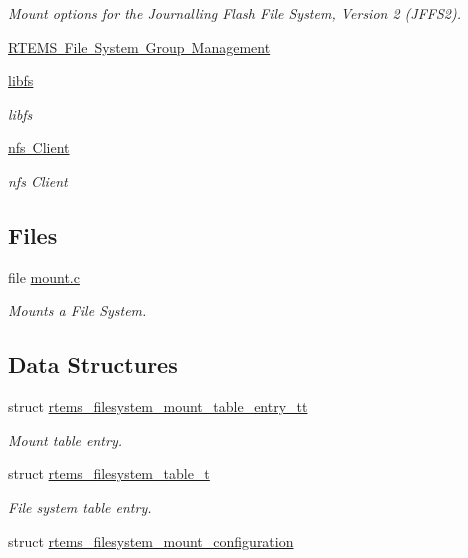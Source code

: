 \begin{DoxyCompactItemize}
\begin{DoxyCompactList}\small\item\em Mount options for the Journalling Flash File System, Version 2 (J\+F\+F\+S2). \end{DoxyCompactList}\item 
\mbox{\hyperlink{group__rtems__rfs}{R\+T\+E\+M\+S File System Group Management}}
\item 
\mbox{\hyperlink{group__libfs}{libfs}}
\begin{DoxyCompactList}\small\item\em libfs \end{DoxyCompactList}\item 
\mbox{\hyperlink{group__nfsclient}{nfs Client}}
\begin{DoxyCompactList}\small\item\em nfs Client \end{DoxyCompactList}\end{DoxyCompactItemize}
\subsection*{Files}
\begin{DoxyCompactItemize}
\item 
file \mbox{\hyperlink{mount_8c}{mount.\+c}}
\begin{DoxyCompactList}\small\item\em Mounts a File System. \end{DoxyCompactList}\end{DoxyCompactItemize}
\subsection*{Data Structures}
\begin{DoxyCompactItemize}
\item 
struct \mbox{\hyperlink{structrtems__filesystem__mount__table__entry__tt}{rtems\+\_\+filesystem\+\_\+mount\+\_\+table\+\_\+entry\+\_\+tt}}
\begin{DoxyCompactList}\small\item\em Mount table entry. \end{DoxyCompactList}\item 
struct \mbox{\hyperlink{structrtems__filesystem__table__t}{rtems\+\_\+filesystem\+\_\+table\+\_\+t}}
\begin{DoxyCompactList}\small\item\em File system table entry. \end{DoxyCompactList}\item 
struct \mbox{\hyperlink{structrtems__filesystem__mount__configuration}{rtems\+\_\+filesystem\+\_\+mount\+\_\+configuration}}
\end{DoxyCompactItemize}
